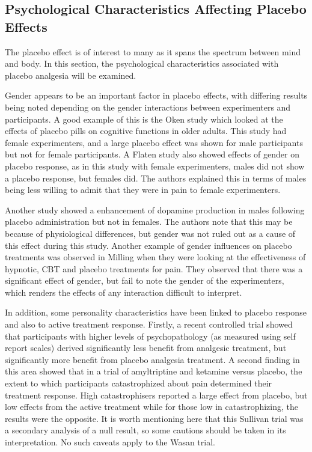 \subsection{Psychological Characteristics Affecting Placebo Effects}
\label{sec:psych-char-affect}

The placebo effect is of interest to many as it spans the spectrum between mind and body.  In this section, the psychological characteristics associated with placebo analgesia will be examined.  

Gender appears to be an important factor in placebo effects, with differing results being noted depending on the gender interactions between experimenters and participants. A good example of this is the Oken \cite{Oken2008} study which looked at the  effects of placebo pills on cognitive functions in older adults. This study had female experimenters, and a large placebo effect was shown for male participants but not for female participants. A Flaten \cite{Flaten2006} study also showed effects of gender on placebo response, as in this study with female experimenters, males did not show a placebo response, but females did. The authors explained this in terms of males being less willing to admit that they were in pain to female experimenters.

 Another study \cite{Zubieta2006} showed a enhancement of dopamine production in males following placebo administration but not in females. The authors note that this may be because of physiological differences, but gender was not ruled out as a cause of this effect during this study. Another example of gender influences on placebo treatments was observed in Milling \cite{Milling2007}  when they were looking at the effectiveness of hypnotic, CBT and placebo treatments for pain. They observed that there was a significant effect of gender, but fail to note the gender of the experimenters, which renders the effects of any interaction difficult to interpret. 

In addition, some personality characteristics have been linked to placebo response and also to active treatment response. Firstly, a recent controlled trial \cite{Wasan2005}  showed that participants with higher levels of psychopathology (as measured using self report scales) derived significantly less benefit from analgesic treatment, but significantly more benefit from placebo analgesia treatment. A second finding in this area \cite{Sullivan2008}  showed that in a trial of amyltriptine and ketamine versus placebo, the extent to which participants catastrophized about pain determined their treatment response. High catastrophisers reported a large effect from placebo, but low effects from the active treatment while for those low in catastrophizing, the results were the opposite. It is worth mentioning here that this Sullivan trial was a secondary analysis of a null result, so some cautions should be taken in its interpretation. No such caveats apply to the Wasan trial. 



